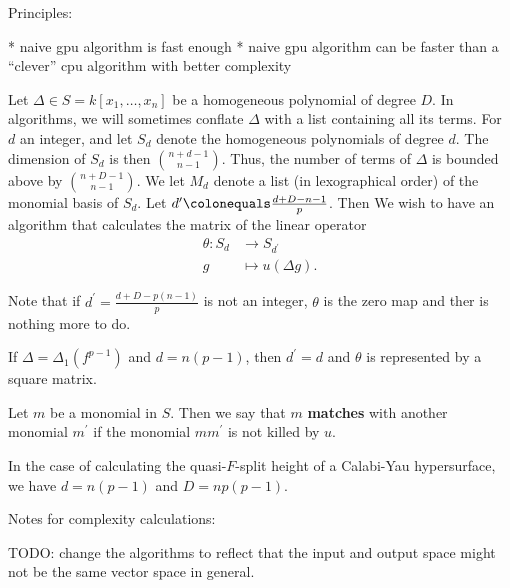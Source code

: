 
Principles: 

* naive gpu algorithm is fast enough
* naive gpu algorithm can be faster than
a ``clever'' cpu algorithm with better complexity


\begin{cxt}
	\label{cxt:mult:split}
	Let \(\Delta \in S = k[x_{1}, \ldots, x_{n}]\)
	be a homogeneous
	polynomial of degree \(D\).
	In algorithms, we will sometimes conflate \(\Delta\) 
	with a list containing all its terms.
	For \(d\) an integer,
	and let \(S_{d}\) denote the homogeneous polynomials of degree \(d\).
	The dimension of \(S_{d}\) is then \(\binom{n+d-1}{n-1}\).
	Thus, the number of terms of \(\Delta\) is bounded 
	above by \(\binom{n+D-1}{n-1}\).
	We let \(M_{d}\) denote a list (in lexographical order)
	of the monomial basis of \(S_{d}\).
	Let \(d^{\prime} \colonequals \frac{d+D-n-1}{p}\).
	Then 
	We wish to have an algorithm that calculates the matrix of
	the linear operator
	\begin{align*}
		\theta : S_{d} &\longrightarrow S_{d^{\prime}} \\
		g &\longmapsto u(\Delta g)
	.\end{align*}
\end{cxt}

\begin{rmk}
	Note that if  \(d^{\prime} = \frac{d+D-p(n-1)}{p}\)
	is not an integer, \(\theta\) is the zero map
	and ther is nothing more to do.
	
	If \(\Delta = \Delta_{1}(f^{p-1})\) and \(d = n(p-1)\),
	then \(d^{\prime} = d\) and \(\theta\) is
	represented by
	a square matrix.
\end{rmk}

\begin{defn}
	Let \(m\) be a monomial in \(S\). 
	Then we say that \(m\) \textbf{matches}
	with another monomial \(m^{\prime}\) 
	if the monomial \(mm^{\prime}\) is
	not killed by \(u\).
\end{defn}

In the case of calculating the quasi-\(F\)-split height of a Calabi-Yau
hypersurface,
we have \(d = n(p-1)\) and \(D = np(p-1)\).

Notes for complexity calculations:

TODO: change the algorithms to reflect that the input and output space
might not be the same vector space in general.

